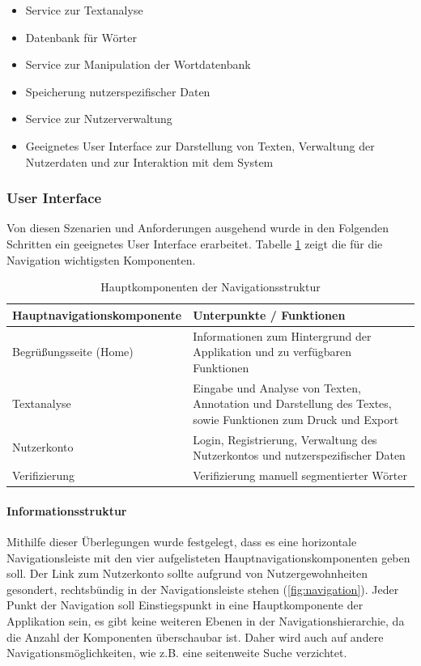 \begin{itemize}
	\item Service zur Textanalyse
	\item Datenbank für Wörter
	\item Service zur Manipulation der Wortdatenbank
	\item Speicherung nutzerspezifischer Daten
	\item Service zur Nutzerverwaltung
	\item Geeignetes User Interface zur Darstellung von Texten, Verwaltung der Nutzerdaten und zur Interaktion mit dem System
\end{itemize}

\subsubsection{User Interface}
Von diesen Szenarien und Anforderungen ausgehend wurde in den Folgenden Schritten ein geeignetes User Interface erarbeitet. Tabelle \ref{table:navigation} zeigt die für die Navigation wichtigsten Komponenten.

\begin{table}[h!]
	\centering
	\begin{tabular}{|l|p{8cm}|}
		\hline
		Hauptnavigationskomponente & Unterpunkte / Funktionen \\
		\hline
		\hline
		Begrüßungsseite (Home) & Informationen zum Hintergrund der Applikation und zu verfügbaren Funktionen\\
		\hline
		Textanalyse & Eingabe und Analyse von Texten, Annotation und Darstellung des Textes, sowie Funktionen zum Druck und Export\\
		\hline
		Nutzerkonto & Login, Registrierung, Verwaltung des Nutzerkontos und nutzerspezifischer Daten \\
		\hline
		Verifizierung & Verifizierung manuell segmentierter Wörter \\
		\hline
	\end{tabular}
	\caption{Hauptkomponenten der Navigationsstruktur}
	\label{table:navigation}
\end{table}

\paragraph{Informationsstruktur}

Mithilfe dieser Überlegungen wurde festgelegt, dass es eine horizontale Navigationsleiste mit den vier aufgelisteten Hauptnavigationskomponenten geben soll. Der Link zum Nutzerkonto sollte aufgrund von Nutzergewohnheiten gesondert, rechtsbündig in der Navigationsleiste stehen (\ref{fig:navigation}). Jeder Punkt der Navigation soll Einstiegspunkt in eine Hauptkomponente der Applikation sein, es gibt keine weiteren Ebenen in der Navigationshierarchie, da die Anzahl der Komponenten überschaubar ist. Daher wird auch auf andere Navigationsmöglichkeiten, wie z.B. eine seitenweite Suche verzichtet.


